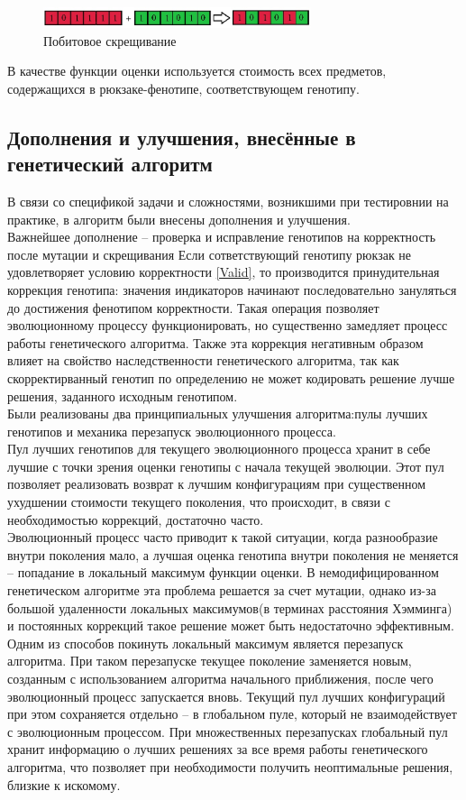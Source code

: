 	\begin{figure}[htbp]
	\includegraphics[width=0.7\textwidth]{./Pics/5.jpg}
	\caption{Побитовое скрещивание}
	\label{crossing3}
\end{figure}
\FloatBarrier
 В качестве функции оценки используется стоимость всех предметов, содержащихся в рюкзаке-фенотипе, соответствующем генотипу.
 
\subsection{Дополнения и улучшения, внесённые в\\ генетический алгоритм}
В связи со спецификой задачи и сложностями, возникшими при тестировнии на практике, в алгоритм были внесены дополнения и улучшения. 
\\Важнейшее дополнение -- проверка и исправление генотипов на корректность после мутации и скрещивания 
Если сответствующий генотипу рюкзак не удовлетворяет условию корректности \ref{Valid}, то производится принудительная коррекция генотипа: значения индикаторов начинают последовательно зануляться до достижения фенотипом корректности.
Такая операция позволяет эволюционному процессу функционировать, но существенно замедляет процесс работы генетического алгоритма.
Также эта коррекция негативным образом влияет на свойство наследственности генетического алгоритма, так как скорректирванный генотип по определению не может кодировать решение лучше решения, заданного исходным генотипом.\\
Были реализованы два принципиальных улучшения алгоритма:пулы лучших генотипов и механика перезапуск эволюционного процесса.\\
Пул лучших генотипов для текущего эволюционного процесса хранит в себе лучшие с точки зрения оценки генотипы с начала текущей эволюции. Этот пул позволяет реализовать возврат к лучшим конфигурациям при существенном ухудшении стоимости текущего поколения, что происходит, в связи с необходимостью коррекций, достаточно часто.\\
Эволюционный процесс часто приводит к такой ситуации, когда разнообразие внутри поколения мало, а лучшая оценка генотипа внутри поколения не меняется -- попадание в локальный максимум функции оценки. В немодифицированном генетическом алгоритме эта проблема решается за счет мутации, однако из-за большой удаленности локальных максимумов(в терминах расстояния Хэмминга) и постоянных коррекций такое решение может быть недостаточно эффективным. 
Одним из способов покинуть локальный максимум является перезапуск алгоритма. 
При таком перезапуске текущее поколение заменяется новым, созданным с использованием алгоритма начального приближения, после чего эволюционный процесс запускается вновь. Текущий пул лучших конфигураций при этом сохраняется отдельно -- в глобальном пуле, который не взаимодействует с эволюционным процессом.
 При множественных перезапусках глобальный пул хранит информацию о лучших решениях за все время работы генетического алгоритма, что позволяет при необходимости получить неоптимальные решения, близкие к искомому.
